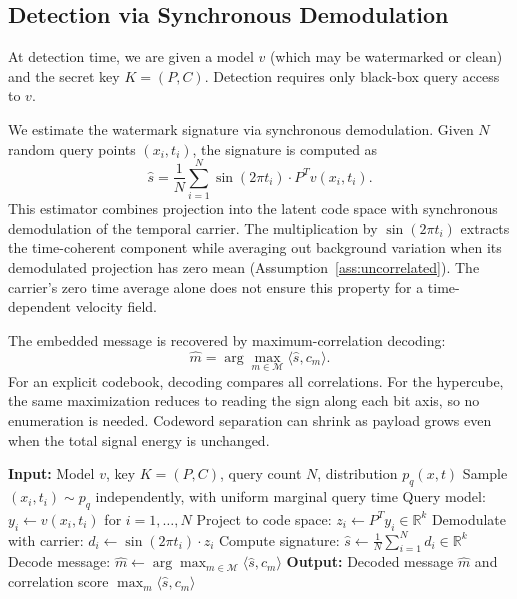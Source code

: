 \documentclass[11pt]{article}
\begin{document}
\subsection{Detection via Synchronous Demodulation}\label{sec:detection}

At detection time, we are given a model $v$ (which may be watermarked
or clean) and the secret key $K = (P, C)$. Detection requires only
black-box query access to $v$.

We estimate the watermark signature via synchronous demodulation. Given
$N$ random query points $(x_i, t_i)$, the signature is computed as
\begin{equation}\label{eq:detection}
\hat{s} = \frac{1}{N}\sum_{i=1}^N \sin(2\pi t_i) \cdot P^T v(x_i, t_i).
\end{equation}
This estimator combines projection into the latent code space with
synchronous demodulation of the temporal carrier. The multiplication by
$\sin(2\pi t_i)$ extracts the time-coherent component while averaging out
background variation when its demodulated projection has zero mean
(Assumption~\ref{ass:uncorrelated}). The carrier's zero time average
alone does not ensure this property for a time-dependent velocity field.

The embedded message is recovered by maximum-correlation decoding:
\begin{equation}
\hat{m} = \arg\max_{m \in \mathcal{M}} \langle \hat{s}, c_m \rangle.
\end{equation}
For an explicit codebook, decoding compares all correlations. For the
hypercube, the same maximization reduces to reading the sign along each
bit axis, so no enumeration is needed. Codeword separation can shrink
as payload grows even when the total signal energy is unchanged.

\begin{algorithm}[t]
\caption{Watermark Detection via Synchronous Demodulation}
\label{alg:detection}
\begin{algorithmic}[1]
\State \textbf{Input:} Model $v$, key $K=(P,C)$, query count $N$, distribution $p_q(x,t)$
\State Sample $(x_i,t_i)\sim p_q$ independently, with uniform marginal query time
\State Query model: $y_i \leftarrow v(x_i, t_i)$ for $i = 1, \dots, N$
\State Project to code space: $z_i \leftarrow P^T y_i \in \mathbb{R}^k$
\State Demodulate with carrier: $d_i \leftarrow \sin(2\pi t_i) \cdot z_i$
\State Compute signature: $\hat{s} \leftarrow \frac{1}{N}\sum_{i=1}^N d_i \in \mathbb{R}^k$
\State Decode message: $\hat{m} \leftarrow \arg\max_{m \in \mathcal{M}} \langle \hat{s}, c_m \rangle$
\State \textbf{Output:} Decoded message $\hat{m}$ and correlation score $\max_m \langle \hat{s}, c_m \rangle$
\end{algorithmic}
\end{algorithm}
\end{document}
